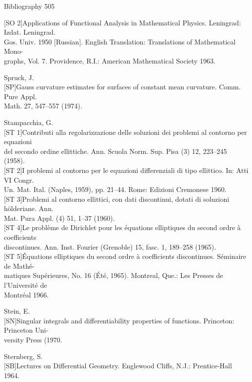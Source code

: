 \begin{flushleft}
Bibliography \hfill 505

{}[SO 2]\quad Applications of Functional Analysis in Mathematical Physics. Leningrad: Izdat. Leningrad.\\
Gos. Univ. 1950 [Russian]. English Translation: Translations of Mathematical Mono-\\
graphs, Vol. 7. Providence, R.I.: American Mathematical Society 1963.

Spruck, J.\\
{}[SP]\quad Gauss curvature estimates for surfaces of constant mean curvature. Comm. Pure Appl.\\
Math. 27, 547--557 (1974).

Stampacchia, G.\\
{}[ST 1]\quad Contributi alla regolarizzazione delle soluzioni dei problemi al contorno per equazioni\\
del secondo ordine ellittiche. Ann. Scuola Norm. Sup. Pisa (3) 12, 223--245 (1958).\\
{}[ST 2]\quad I problemi al contorno per le equazioni differenziali di tipo ellittico. In: Atti VI Congr.\\
Un. Mat. Ital. (Naples, 1959), pp. 21--44. Rome: Edizioni Cremonese 1960.\\
{}[ST 3]\quad Problemi al contorno ellittici, con dati discontinui, dotati di soluzioni hölderiane. Ann.\\
Mat. Pura Appl. (4) 51, 1--37 (1960).\\
{}[ST 4]\quad Le problème de Dirichlet pour les équations elliptiques du second ordre à coefficients\\
discontinues. Ann. Inst. Fourier (Grenoble) 15, fasc. 1, 189--258 (1965).\\
{}[ST 5]\quad Équations elliptiques du second ordre à coefficients discontinues. Séminaire de Mathé-\\
matiques Supérieures, No. 16 (Été, 1965). Montreal, Que.: Les Presses de l'Université de\\
Montréal 1966.

Stein, E.\\
{}[SN]\quad Singular integrals and differentiability properties of functions. Princeton: Princeton Uni-\\
versity Press (1970.

Sternberg, S.\\
{}[SB]\quad Lectures on Differential Geometry. Englewood Cliffs, N.J.: Prentice-Hall 1964.


\end{flushleft}
